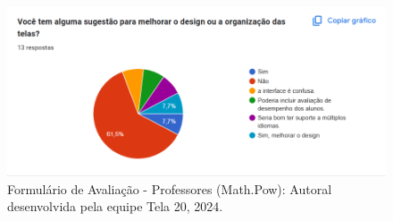 \documentclass[12pt, openany, oneside, a4paper, english, brazil]{abntex2}   %
\begin{document}
\begin{figure}
    \centering
    \includegraphics{figuras/Formulário Gráficos/Professores/16 Voce tem alguma sugestao para melhorar o design ou organizacao das telas.png}
    \caption{Formulário de Avaliação - Professores (Math.Pow):  Autoral desenvolvida pela equipe Tela 20, 2024.}
    \label{gráfico gerado pelo formulário}
\end{figure}
\end{document}
